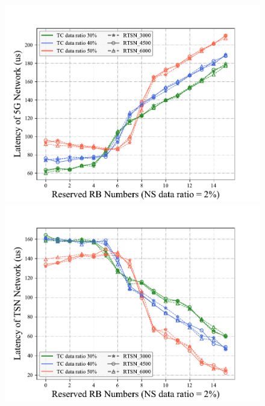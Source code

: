 \documentclass{SCIS2021}
\begin{document}
\begin{figure}[t]
{\begin{minipage}[b]{0.33\textwidth}
				\includegraphics[width=1\textwidth]{t_5G_TC.pdf} \\
				\includegraphics[width=1\textwidth]{t_TSN_TC.pdf}
			\end{minipage}
		\hspace{-0.02\textwidth}
		}
\end{figure}
\end{document}
